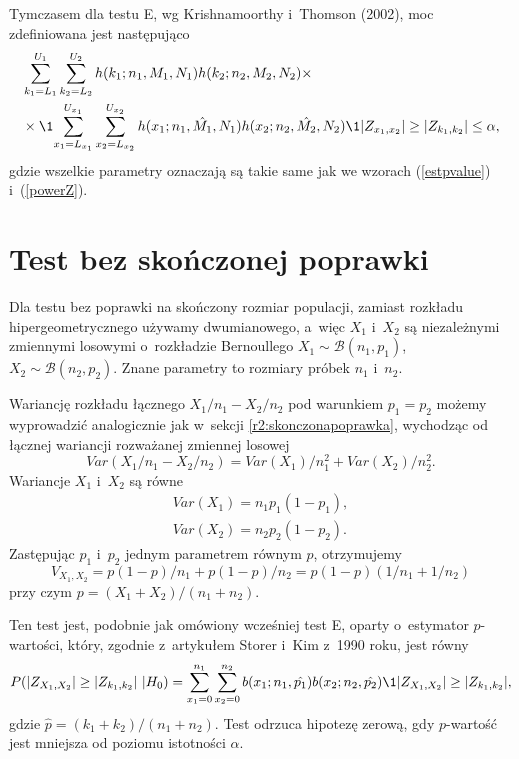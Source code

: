 Tymczasem dla testu E, wg Krishnamoorthy i~Thomson (2002), moc zdefiniowana jest następująco \cite{K.Krishnamoorthy2002}
\begin{equation}
\begin{split}
&\sum_{k_1=L_1}^{U_1}\sum_{k_2=L_2}^{U_2} h(k_1;n_1,M_1,N_1)h(k_2;n_2,M_2,N_2) \times \\
&\times \1{\sum_{x_1=L_{x_1}}^{U_{x_1}}\sum_{x_2=L_{x_2}}^{U_{x_2}} h(x_1;n_1,\hat{M_1},N_1)h(x_2;n_2,\hat{M_2},N_2) \1{|Z_{x_1,x_2}|\geq|Z_{k_1,k_2}|}\leq\alpha },
\end{split}
\end{equation}
gdzie wszelkie parametry oznaczają są takie same jak we wzorach (\ref{estpvalue}) i~(\ref{powerZ}).

\section{Test bez skończonej poprawki}
Dla testu bez poprawki na skończony rozmiar populacji, zamiast rozkładu hipergeometrycznego używamy dwumianowego, a~więc $X_1$ i~$X_2$ są niezależnymi zmiennymi losowymi o~rozkładzie Bernoullego $X_1\sim \mathcal{B}(n_1,p_1)$, $X_2\sim \mathcal{B}(n_2,p_2)$. Znane parametry to rozmiary próbek $n_1$ i~$n_2$.

Wariancję rozkładu łącznego $X_1/n_1-X_2/n_2$ pod warunkiem $p_1=p_2$ możemy wyprowadzić analogicznie jak w~sekcji \ref{r2:skonczonapoprawka}, wychodząc od łącznej wariancji rozważanej zmiennej losowej
\begin{equation}
Var(X_1/n_1-X_2/n_2) = Var(X_1)/n_1^2+Var(X_2)/n_2^2.
\end{equation}
Wariancje $X_1$ i~$X_2$ są równe
\begin{align}
Var(X_1)=n_1 p_1 (1-p_1),\\
Var(X_2)=n_2 p_2 (1-p_2).
\end{align}
Zastępując $p_1$ i~$p_2$ jednym parametrem równym $p$, otrzymujemy
\begin{equation}
V_{X_1,X_2} = p(1-p)/n_1 + p(1-p)/n_2 = p(1-p)(1/n_1+1/n_2)
\end{equation}
przy czym $p=(X_1+X_2)/(n_1+n_2)$.

Ten test jest, podobnie jak omówiony wcześniej test E, oparty o~estymator $p$-wartości, który, zgodnie z~artykułem Storer i~Kim z~1990 roku, jest równy \cite{Storer1990}
\begin{equation}
P(|Z_{X_1,X_2}|\geq|Z_{k_1,k_2}|\ |H_0) = \sum_{x_1=0}^{n_1}\sum_{x_2=0}^{n_2} b(x_1;n_1,\hat{p_1})b(x_2;n_2,\hat{p_2})\1{|Z_{X_1,X_2}|\geq|Z_{k_1,k_2}|},
\end{equation}
gdzie $\hat{p}=(k_1+k_2)/(n_1+n_2)$.
Test odrzuca hipotezę zerową, gdy $p$-wartość jest mniejsza od poziomu istotności $\alpha$.

